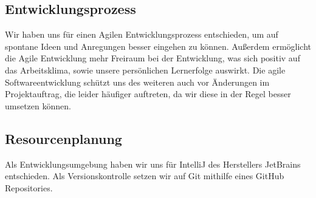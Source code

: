 \subsection{Entwicklungsprozess}
\label{sec:Entwicklungsprozess}
Wir haben uns für einen Agilen Entwicklungsprozess entschieden, um auf spontane Ideen und Anregungen
besser eingehen zu können. Außerdem ermöglicht die Agile Entwicklung mehr Freiraum bei der
Entwicklung, was sich positiv auf das Arbeitsklima, sowie unsere persönlichen Lernerfolge auswirkt.
Die agile Softwareentwicklung schützt uns des weiteren auch vor Änderungen im Projektauftrag, die leider
häufiger auftreten, da wir diese in der Regel besser umsetzen können.

\subsection{Resourcenplanung}
\label{sec:Resourcenplanung}
Als Entwicklungsumgebung haben wir uns für IntelliJ des Herstellers JetBrains entschieden.
Als Versionskontrolle setzen wir auf Git mithilfe eines GitHub Repositories.